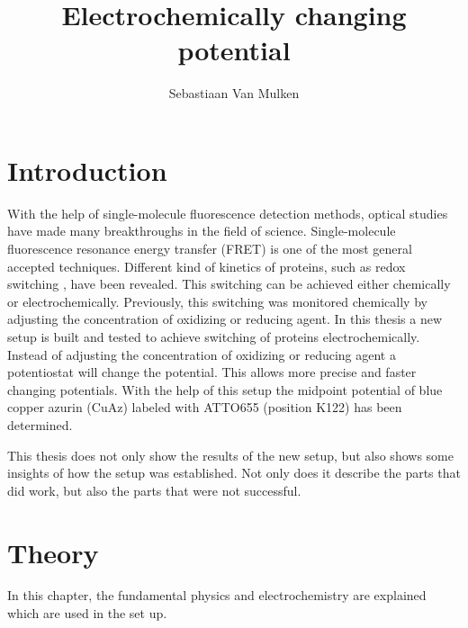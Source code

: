 \documentclass[twoside,single]{lion-msc}
\title{Electrochemically changing potential}
\author{Sebastiaan Van Mulken}
\begin{document}
\maketitle



\chapter{Introduction}
With the help of single-molecule fluorescence detection methods, optical studies have made many breakthroughs in the field of science. Single-molecule fluorescence resonance energy transfer (FRET) is one of the most general accepted techniques. Different kind of kinetics of proteins, such as redox switching \cite{Akklc}, have been revealed. This switching can be achieved either chemically or electrochemically. Previously, this switching was monitored chemically by adjusting the concentration of oxidizing or reducing agent. In this thesis a new setup is built and tested to achieve switching of proteins electrochemically. Instead of adjusting the concentration of oxidizing or reducing agent a potentiostat will change the potential. This allows more precise and faster changing potentials. With the help of this setup the midpoint potential of blue copper azurin (CuAz) labeled with ATTO655 (position K122) has been determined. 

This thesis does not only show the results of the new setup, but also shows some insights of how the setup was established. Not only does it describe the parts that did work, but also the parts that were not successful. 


\chapter{Theory}
In this chapter, the fundamental physics and electrochemistry are explained which are used in the set up.
\end{document}

